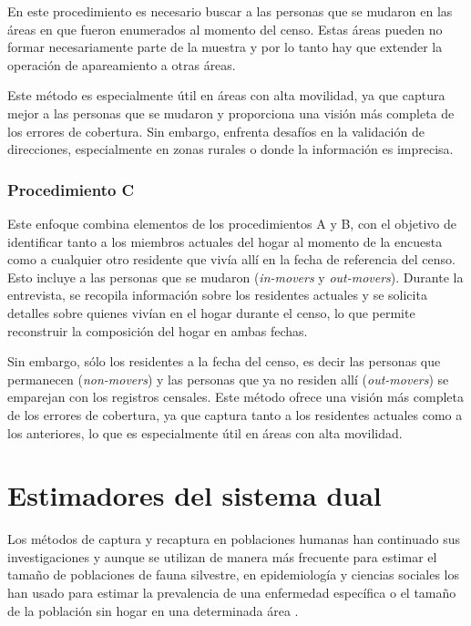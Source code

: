 \documentclass[
  12pt,
]{book}
\begin{document}
En este procedimiento es necesario buscar a las personas que se mudaron en las áreas en que fueron enumerados al momento del censo. Estas áreas pueden no formar necesariamente parte de la muestra y por lo tanto hay que extender la operación de apareamiento a otras áreas.

Este método es especialmente útil en áreas con alta movilidad, ya que captura mejor a las personas que se mudaron y proporciona una visión más completa de los errores de cobertura. Sin embargo, enfrenta desafíos en la validación de direcciones, especialmente en zonas rurales o donde la información es imprecisa.

\subsection{Procedimiento C}\label{procedimiento-c}

Este enfoque combina elementos de los procedimientos A y B, con el objetivo de identificar tanto a los miembros actuales del hogar al momento de la encuesta como a cualquier otro residente que vivía allí en la fecha de referencia del censo. Esto incluye a las personas que se mudaron (\emph{in-movers} y \emph{out-movers}). Durante la entrevista, se recopila información sobre los residentes actuales y se solicita detalles sobre quienes vivían en el hogar durante el censo, lo que permite reconstruir la composición del hogar en ambas fechas.

Sin embargo, sólo los residentes a la fecha del censo, es decir las personas que permanecen (\emph{non-movers}) y las personas que ya no residen allí (\emph{out-movers}) se emparejan con los registros censales. Este método ofrece una visión más completa de los errores de cobertura, ya que captura tanto a los residentes actuales como a los anteriores, lo que es especialmente útil en áreas con alta movilidad.

\chapter{Estimadores del sistema dual}\label{cap-estim}

Los métodos de captura y recaptura en poblaciones humanas han continuado sus investigaciones y aunque se utilizan de manera más frecuente para estimar el tamaño de poblaciones de fauna silvestre, en epidemiología y ciencias sociales los han usado para estimar la prevalencia de una enfermedad específica o el tamaño de la población sin hogar en una determinada área \citep{brittain2009estimators}.
\end{document}
